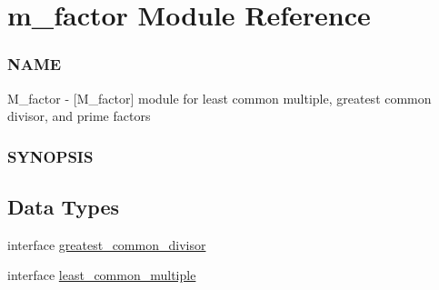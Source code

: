 \hypertarget{namespacem__factor}{}\section{m\+\_\+factor Module Reference}
\label{namespacem__factor}


\subsubsection*{N\+A\+ME}

M\+\_\+factor -\/ \mbox{[}M\+\_\+factor\mbox{]} module for least common multiple, greatest common divisor, and prime factors \subsubsection*{S\+Y\+N\+O\+P\+S\+IS} 


\subsection*{Data Types}
\begin{DoxyCompactItemize}
\item 
interface \hyperlink{interfacem__factor_1_1greatest__common__divisor}{greatest\+\_\+common\+\_\+divisor}
\item 
interface \hyperlink{interfacem__factor_1_1least__common__multiple}{least\+\_\+common\+\_\+multiple}
\end{DoxyCompactItemize}
